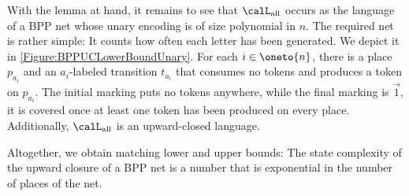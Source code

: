 \documentclass[../../diss.tex]{subfiles}
\begin{document}
With the lemma at hand, it remains to see that $\calL_{\text{all}}$ occurs as the language of a BPP net whose unary encoding is of size polynomial in $n$.
The required net is rather simple: It counts how often each letter has been generated.
We depict it in  \cref{Figure:BPPUCLowerBoundUnary}.
For each $i \in \oneto{n}$, there is a place $p_{a_i}$ and an $a_i$-labeled transition $t_{a_i}$ that consumes no tokens and produces a token on $p_{a_i}$.
The initial marking puts no tokens anywhere, while the final marking is $\vec{1}$, \ie it is covered once at least one token has been produced on every place.
Additionally, $\calL_{\text{all}}$ is an upward-closed language.

Altogether, we obtain matching lower and upper bounds: The state complexity of the upward closure of a BPP net is a number that is exponential in the number of places of the net.
\end{document}
